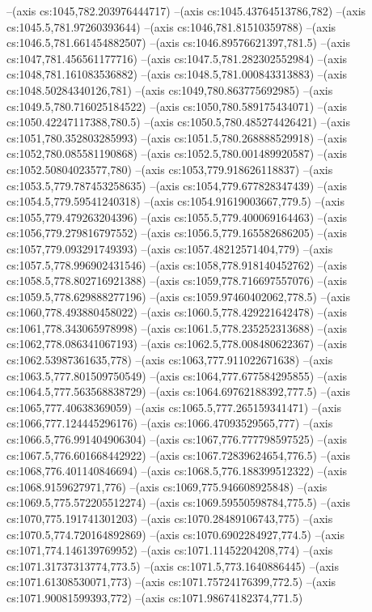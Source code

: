 --(axis cs:1045,782.203976444717)
--(axis cs:1045.43764513786,782)
--(axis cs:1045.5,781.97260393644)
--(axis cs:1046,781.81510359788)
--(axis cs:1046.5,781.661454882507)
--(axis cs:1046.89576621397,781.5)
--(axis cs:1047,781.456561177716)
--(axis cs:1047.5,781.282302552984)
--(axis cs:1048,781.161083536882)
--(axis cs:1048.5,781.000843313883)
--(axis cs:1048.50284340126,781)
--(axis cs:1049,780.863775692985)
--(axis cs:1049.5,780.716025184522)
--(axis cs:1050,780.589175434071)
--(axis cs:1050.42247117388,780.5)
--(axis cs:1050.5,780.485274426421)
--(axis cs:1051,780.352803285993)
--(axis cs:1051.5,780.268888529918)
--(axis cs:1052,780.085581190868)
--(axis cs:1052.5,780.001489920587)
--(axis cs:1052.50804023577,780)
--(axis cs:1053,779.918626118837)
--(axis cs:1053.5,779.787453258635)
--(axis cs:1054,779.677828347439)
--(axis cs:1054.5,779.59541240318)
--(axis cs:1054.91619003667,779.5)
--(axis cs:1055,779.479263204396)
--(axis cs:1055.5,779.400069164463)
--(axis cs:1056,779.279816797552)
--(axis cs:1056.5,779.165582686205)
--(axis cs:1057,779.093291749393)
--(axis cs:1057.48212571404,779)
--(axis cs:1057.5,778.996902431546)
--(axis cs:1058,778.918140452762)
--(axis cs:1058.5,778.802716921388)
--(axis cs:1059,778.716697557076)
--(axis cs:1059.5,778.629888277196)
--(axis cs:1059.97460402062,778.5)
--(axis cs:1060,778.493880458022)
--(axis cs:1060.5,778.429221642478)
--(axis cs:1061,778.343065978998)
--(axis cs:1061.5,778.235252313688)
--(axis cs:1062,778.086341067193)
--(axis cs:1062.5,778.008480622367)
--(axis cs:1062.53987361635,778)
--(axis cs:1063,777.911022671638)
--(axis cs:1063.5,777.801509750549)
--(axis cs:1064,777.677584295855)
--(axis cs:1064.5,777.563568838729)
--(axis cs:1064.69762188392,777.5)
--(axis cs:1065,777.40638369059)
--(axis cs:1065.5,777.265159341471)
--(axis cs:1066,777.124445296176)
--(axis cs:1066.47093529565,777)
--(axis cs:1066.5,776.991404906304)
--(axis cs:1067,776.777798597525)
--(axis cs:1067.5,776.601668442922)
--(axis cs:1067.72839624654,776.5)
--(axis cs:1068,776.401140846694)
--(axis cs:1068.5,776.188399512322)
--(axis cs:1068.9159627971,776)
--(axis cs:1069,775.946608925848)
--(axis cs:1069.5,775.572205512274)
--(axis cs:1069.59550598784,775.5)
--(axis cs:1070,775.191741301203)
--(axis cs:1070.28489106743,775)
--(axis cs:1070.5,774.720164892869)
--(axis cs:1070.6902284927,774.5)
--(axis cs:1071,774.146139769952)
--(axis cs:1071.11452204208,774)
--(axis cs:1071.31737313774,773.5)
--(axis cs:1071.5,773.1640886445)
--(axis cs:1071.61308530071,773)
--(axis cs:1071.75724176399,772.5)
--(axis cs:1071.90081599393,772)
--(axis cs:1071.98674182374,771.5)
